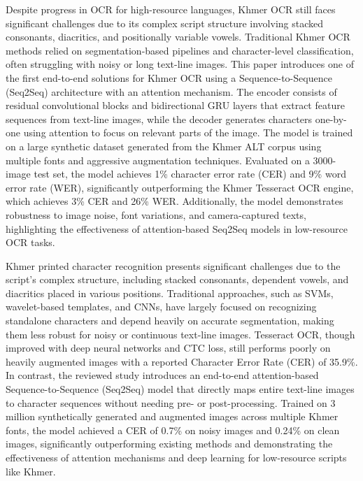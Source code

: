 \citet{buoy2021seq2seq} Despite progress in OCR for high-resource languages, 
Khmer OCR still faces significant challenges due to its complex script structure 
involving stacked consonants, diacritics, and positionally variable vowels. Traditional 
Khmer OCR methods relied on segmentation-based pipelines and character-level 
classification, often struggling with noisy or long text-line images. This paper 
introduces one of the first end-to-end solutions for Khmer OCR using a 
Sequence-to-Sequence (Seq2Seq) architecture with an attention mechanism. The encoder 
consists of residual convolutional blocks and bidirectional GRU layers that extract 
feature sequences from text-line images, while the decoder generates characters one-by-one 
using attention to focus on relevant parts of the image. The model is trained on a large 
synthetic dataset generated from the Khmer ALT corpus using multiple fonts and aggressive 
augmentation techniques. Evaluated on a 3000-image test set, the model achieves 1\% 
character error rate (CER) and 9\% word error rate (WER), significantly outperforming 
the Khmer Tesseract OCR engine, which achieves 3\% CER and 26\% WER. Additionally, 
the model demonstrates robustness to image noise, font variations, and camera-captured texts, 
highlighting the effectiveness of attention-based Seq2Seq models in low-resource OCR tasks.

\citet{Buoy2022} Khmer printed character recognition presents significant 
challenges due to the script's complex structure, including stacked consonants, 
dependent vowels, and diacritics placed in various positions. Traditional approaches, 
such as SVMs, wavelet-based templates, and CNNs, have largely focused on recognizing standalone 
characters and depend heavily on accurate segmentation, making them less robust for noisy or 
continuous text-line images. Tesseract OCR, though improved with deep neural networks 
and CTC loss, still performs poorly on heavily augmented images with a reported Character 
Error Rate (CER) of 35.9\%. In contrast, the reviewed study introduces an end-to-end 
attention-based Sequence-to-Sequence (Seq2Seq) model that directly maps entire text-line 
images to character sequences without needing pre- or post-processing. Trained on 3 million 
synthetically generated and augmented images across multiple Khmer fonts, the model 
achieved a CER of 0.7\% on noisy images and 0.24\% on clean images, significantly 
outperforming existing methods and demonstrating the effectiveness of attention mechanisms 
and deep learning for low-resource scripts like Khmer.


